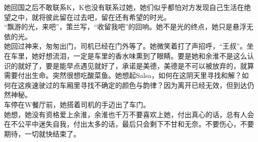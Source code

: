 \documentclass[letterpaper, 12pt]{article}
\begin{document}
\begin{multicols}{2}
她回国之后不敢联系K，K也没有联系过她，她们似乎都怕对方发现自己生活在绝望之中，就将彼此留在过去吧，留在还有希望的时光。\\

“飘游的光，来吧”，策兰写，“收留我吧”的回响。她不是光的终点，她只是悬浮无依的光。\\

她回过神来，匆匆出门，司机已经在门外等了。她微笑着打了声招呼，“王叔”。坐在车里，她好想流泪，一定是车里的香水味熏到了眼睛。要是她和余淮不是这么认识的就好了，要是能早点遇见就好了，承诺是美德，美德是不可以被放弃的，就算需要付出生命。突然很想吃酸菜鱼。她想起Salsa，如何在这阴天里寻找和解？如何在这疾速驶过的车厢里寻找不确定的颜色与韵律？因为离开已经无效，但到达仍然神秘。\\

车停在W餐厅前，她搭着司机的手迈出了车门。\\

她想，她没有资格爱上余淮，余淮也千万不要喜欢上她，付出真心的话，总有人会在不公平中迷失自我，付出太多的话，最后只会剩下不甘和无奈。不要伤心，不要期待，一切就快结束了。\\

\end{multicols} 
\end{document}
